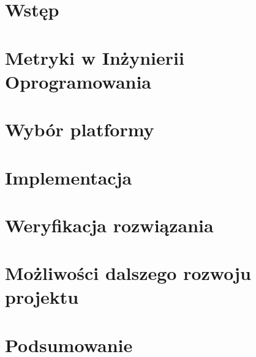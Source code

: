 \chapter*{Wstęp}




\chapter{Metryki w Inżynierii Oprogramowania}



\newpage



\chapter{Wybór platformy}


\chapter{Implementacja}


\chapter{Weryfikacja rozwiązania}


\chapter{Możliwości dalszego rozwoju projektu}


\chapter{Podsumowanie}

